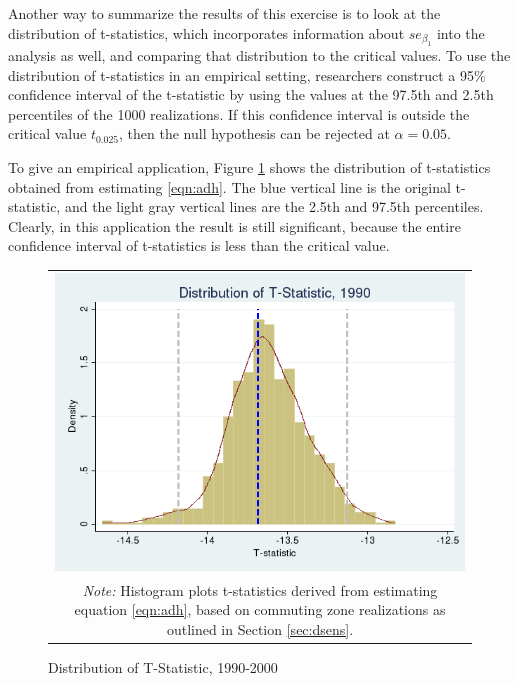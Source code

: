 Another way to summarize the results of this exercise is to look at the distribution of t-statistics, which incorporates information about $se_{\beta_1}$ into the analysis as well, and comparing that distribution to the critical values. To use the distribution of t-statistics in an empirical setting, researchers construct a 95\% confidence interval of the t-statistic by using the values at the 97.5th and 2.5th percentiles of the 1000 realizations. If this confidence interval is outside the critical value $t_{0.025}$, then the null hypothesis can be rejected at $\alpha = 0.05$. 

To give an empirical application, Figure \ref{fig:1990_tdist} shows the distribution of t-statistics obtained from estimating \ref{eqn:adh}. The blue vertical line is the original t-statistic, and the light gray vertical lines are the 2.5th and 97.5th percentiles. Clearly, in this application the result is still significant, because the entire confidence interval of t-statistics is less than the critical value.

\begin{figure}\centering
\caption{Distribution of T-Statistic, 1990-2000 \label{fig:1990_tdist}}
\begin{tabular}{c}
\includegraphics[scale=.5]{./figures/1990_tstat_distribution.png}\\
\multicolumn{1}{p{4.5in}}{\footnotesize \emph{Note:} Histogram plots t-statistics derived from estimating  equation \ref{eqn:adh}, based on commuting zone realizations as outlined in Section \ref{sec:dsens}.}
\end{tabular}
\end{figure}

